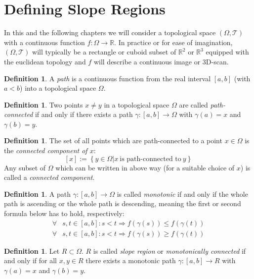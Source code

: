 \documentclass[11pt,twoside,twocolumn,a4paper]{article}
\theoremstyle{plain}
\theoremstyle{definition}
\newtheorem{defn}[thm]{Definition} %
\begin{document}
\section{Defining Slope Regions}
\label{sec:definitions}


In this and the following chapters we will consider a topological space $(\Omega, \mathcal T)$ with a continuous function $f: \Omega \to \mathbb{R}$.
In practice or for ease of imagination, $(\Omega, \mathcal T)$ will typically be a rectangle or cuboid subset of $\mathbb R^2$ or $\mathbb R^3$ equipped with the euclidean topology and $f$ will describe a continuous image or 3D-scan.

\begin{defn}
A \emph{path} is a continuous function from the real interval $[a,b]$ (with $a<b$) into a topological space $\Omega$.
\end{defn}


\begin{defn}
Two points $x\neq y$ in a topological space $\Omega$ are called \emph{path-connected} if and only if there exists a path $\gamma: [a,b] \to \Omega$ with $\gamma (a)=x$ and  $\gamma (b)=y$.
\end{defn}

\begin{defn}
The set of all points which are path-connected to a point $x\in\Omega$ is the \emph{connected component of $x$}:
$$[x]:=\left\{ y\in\Omega | x ~\text{is path-connected to}~ y \right\}$$
Any subset of $\Omega$ which can be written in above way (for a suitable choice of $x$) is called a \emph{connected component}.
\end{defn}

\begin{defn}
A path $\gamma: [a,b] \to \Omega$ is called \emph{monotonic} if and only if the whole path is ascending or the whole path is descending, meaning the first or second formula below has to hold, respectively:
\begin{align*}
\forall & s, t \in [a,b]: s < t \Rightarrow f(\gamma(s)) \leq f(\gamma(t))\\
\forall & s, t \in [a,b]: s < t \Rightarrow f(\gamma(s)) \geq f(\gamma(t))
\end{align*}
\end{defn}

\begin{defn}
Let $R \subset \Omega$. $R$ is called \emph{slope region} or \emph{monotonically connected} if and only if for all $x, y \in R$ there exists a monotonic path $\gamma: [a,b] \to R$ with $\gamma(a) = x$ and $\gamma(b) = y$.
\end{defn}
\end{document}
